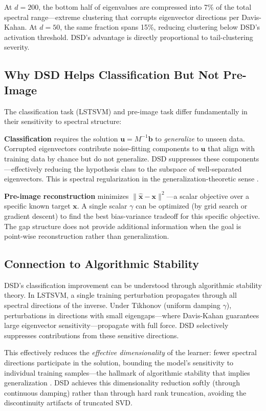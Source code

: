 \documentclass[journal]{IEEEtran}
\begin{document}
At $d{=}200$, the bottom half of eigenvalues are compressed into 7\% of the total spectral range---extreme clustering that corrupts eigenvector directions per Davis-Kahan. At $d{=}50$, the same fraction spans 15\%, reducing clustering below DSD's activation threshold. DSD's advantage is directly proportional to tail-clustering severity.

\subsection{Why DSD Helps Classification But Not Pre-Image}

The classification task (LSTSVM) and pre-image task differ fundamentally in their sensitivity to spectral structure:

\textbf{Classification} requires the solution $\bm{u} = M^{-1} \bm{b}$ to \emph{generalize} to unseen data. Corrupted eigenvectors contribute noise-fitting components to $\bm{u}$ that align with training data by chance but do not generalize. DSD suppresses these components---effectively reducing the hypothesis class to the subspace of well-separated eigenvectors. This is spectral regularization in the generalization-theoretic sense \cite{bousquet2002stability}.

\textbf{Pre-image reconstruction} minimizes $\|\hat{\bm{x}} - \bm{x}\|^2$---a scalar objective over a specific known target $\bm{x}$. A single scalar $\gamma$ can be optimized (by grid search or gradient descent) to find the best bias-variance tradeoff for this specific objective. The gap structure does not provide additional information when the goal is point-wise reconstruction rather than generalization.

\subsection{Connection to Algorithmic Stability}

DSD's classification improvement can be understood through algorithmic stability theory. In LSTSVM, a single training perturbation propagates through all spectral directions of the inverse. Under Tikhonov (uniform damping $\gamma$), perturbations in directions with small eigengaps---where Davis-Kahan guarantees large eigenvector sensitivity---propagate with full force. DSD selectively suppresses contributions from these sensitive directions.

This effectively reduces the \emph{effective dimensionality} of the learner: fewer spectral directions participate in the solution, bounding the model's sensitivity to individual training samples---the hallmark of algorithmic stability that implies generalization \cite{bousquet2002stability}. DSD achieves this dimensionality reduction softly (through continuous damping) rather than through hard rank truncation, avoiding the discontinuity artifacts of truncated SVD.
\end{document}
